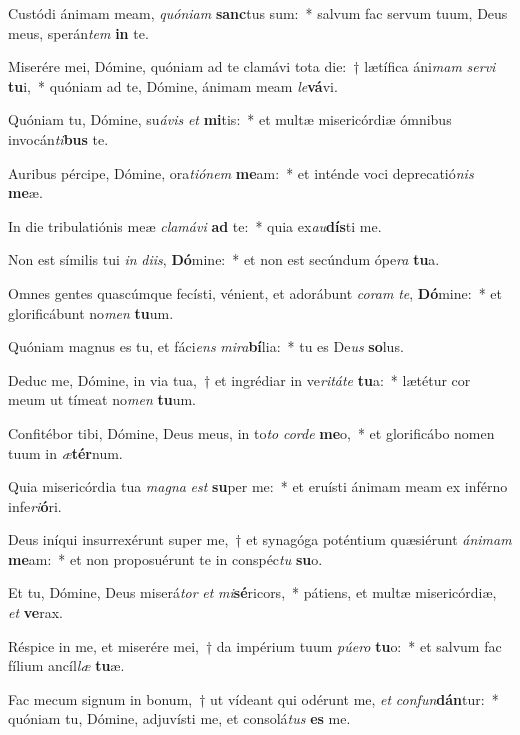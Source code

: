 \item Custódi ánimam meam, \textit{quón}\textit{i}\textit{am} \textbf{sanc}tus sum:~* salvum fac servum tuum, Deus meus, sperán\textit{tem} \textbf{in} te.
\item Miserére mei, Dómine, quóniam ad te clamávi tota die:~† lætífica áni\textit{mam} \textit{ser}\textit{vi} \textbf{tu}i,~* quóniam ad te, Dómine, ánimam meam \textit{le}\textbf{vá}vi.
\item Quóniam tu, Dómine, su\textit{á}\textit{vis} \textit{et} \textbf{mi}tis:~* et multæ misericórdiæ ómnibus invocán\textit{ti}\textbf{bus} te.
\item Auribus pércipe, Dómine, ora\textit{ti}\textit{ó}\textit{nem} \textbf{me}am:~* et inténde voci deprecatió\textit{nis} \textbf{me}æ.
\item In die tribulatiónis meæ \textit{cla}\textit{má}\textit{vi} \textbf{ad} te:~* quia ex\textit{au}\textbf{dís}ti me.
\item Non est símilis tui \textit{in} \textit{di}\textit{is}, \textbf{Dó}mine:~* et non est secúndum ópe\textit{ra} \textbf{tu}a.
\item Omnes gentes quascúmque fecísti, vénient, et adorábunt \textit{co}\textit{ram} \textit{te}, \textbf{Dó}mine:~* et glorificábunt no\textit{men} \textbf{tu}um.
\item Quóniam magnus es tu, et fáci\textit{ens} \textit{mi}\textit{ra}\textbf{bí}lia:~* tu es De\textit{us} \textbf{so}lus.
\item Deduc me, Dómine, in via tua,~† et ingrédiar in ve\textit{ri}\textit{tá}\textit{te} \textbf{tu}a:~* lætétur cor meum ut tímeat no\textit{men} \textbf{tu}um.
\item Confitébor tibi, Dómine, Deus meus, in to\textit{to} \textit{cor}\textit{de} \textbf{me}o,~* et glorificábo nomen tuum in \textit{æ}\textbf{tér}num.
\item Quia misericórdia tua \textit{ma}\textit{gna} \textit{est} \textbf{su}per me:~* et eruísti ánimam meam ex inférno infe\textit{ri}\textbf{ó}ri.
\item Deus iníqui insurrexérunt super me,~† et synagóga poténtium quæsiérunt \textit{á}\textit{ni}\textit{mam} \textbf{me}am:~* et non proposuérunt te in conspéc\textit{tu} \textbf{su}o.
\item Et tu, Dómine, Deus miserá\textit{tor} \textit{et} \textit{mi}\textbf{sé}ricors,~* pátiens, et multæ misericórdiæ, \textit{et} \textbf{ve}rax.
\item Réspice in me, et miserére mei,~† da impérium tuum \textit{pú}\textit{e}\textit{ro} \textbf{tu}o:~* et salvum fac fílium ancíl\textit{læ} \textbf{tu}æ.
\item Fac mecum signum in bonum,~† ut vídeant qui odérunt me, \textit{et} \textit{con}\textit{fun}\textbf{dán}tur:~* quóniam tu, Dómine, adjuvísti me, et consolá\textit{tus} \textbf{es} me.
